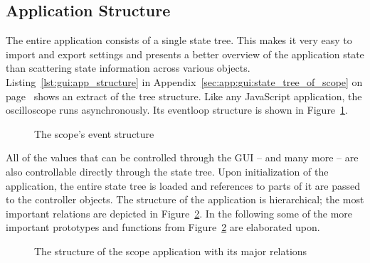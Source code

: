 %
%
\subsection{Application Structure} %
\label{subsec:gui:application_structure}


The  entire   application  consists  of   a  single  state   tree. This  makes
it   very   easy   to   import    and   export   settings   and   presents   a
better   overview   of   the   application   state   than   scattering   state
information   across  various   objects.   Listing~\ref{lst:gui:app_structure}
in              Appendix~\ref{sec:app:gui:state_tree_of_scope}              on
page~\pageref{sec:app:gui:state_tree_of_scope}   shows  an   extract  of   the
tree   structure. Like   any    JavaScript   application,   the   oscilloscope
runs     asynchronously. Its    eventloop     structure     is    shown     in
Figure~\ref{fig:gui:eventstructure}.

\begin{figure}
    \centering
    
    \caption[Scope Event Structure]{%
        The scope's event structure
    }
    \label{fig:gui:eventstructure}
\end{figure}

All of the values  that can be controlled through the GUI --  and many more --
are  also controllable  directly through  the state  tree. Upon initialization
of  the  application, the  entire  state  tree  is  loaded and  references  to
parts  of it  are passed  to  the controller  objects.  The  structure of  the
application  is hierarchical;  the most  important relations  are depicted  in
Figure~\ref{fig:gui:structure}.  In  the following some of  the more important
prototypes  and functions  from Figure~\ref{fig:gui:structure}  are elaborated
upon.

\begin{figure}
    \centering
    
    \caption[The scope structure]{%
        The structure of the scope application with its major relations%
    }
    \label{fig:gui:structure}
\end{figure}

